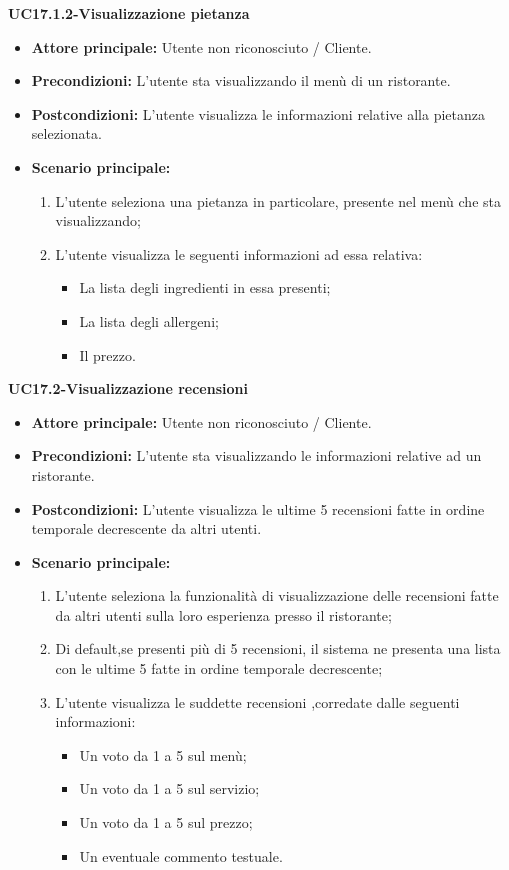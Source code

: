 \textbf{UC17.1.2-Visualizzazione pietanza}
\begin{itemize}
\item \textbf{Attore principale:} Utente non riconosciuto / Cliente.
\item \textbf{Precondizioni:} L'utente sta visualizzando il menù di un ristorante.
\item \textbf{Postcondizioni:} L'utente visualizza le informazioni relative alla pietanza selezionata.
\item \textbf{Scenario principale:}
\begin{enumerate}
    \item L'utente seleziona una pietanza in particolare, presente nel menù che sta visualizzando;
    \item L'utente visualizza le seguenti informazioni ad essa relativa:
    \begin{itemize}
        \item La lista degli ingredienti in essa presenti;
        \item La lista degli allergeni;
        \item Il prezzo.
    \end{itemize}
\end{enumerate}
\end{itemize}

\textbf{UC17.2-Visualizzazione recensioni}
\begin{itemize}
\item \textbf{Attore principale:} Utente non riconosciuto / Cliente.
\item \textbf{Precondizioni:} L'utente sta visualizzando le informazioni relative ad un ristorante.
\item \textbf{Postcondizioni:} L'utente visualizza le ultime 5 recensioni fatte in ordine temporale decrescente da altri utenti.
\item \textbf{Scenario principale:}
\begin{enumerate}
    \item L'utente seleziona la funzionalità di visualizzazione delle recensioni fatte da altri utenti
    sulla loro esperienza presso il ristorante;
    \item Di default,se presenti più di 5 recensioni, il sistema ne presenta una lista con le ultime 5 fatte in ordine temporale decrescente;
    \item L'utente visualizza le suddette recensioni ,corredate dalle seguenti informazioni:
    \begin{itemize}
        \item Un voto da 1 a 5 sul menù;
        \item Un voto da 1 a 5 sul servizio;
        \item Un voto da 1 a 5 sul prezzo;
        \item Un eventuale commento testuale.
    \end{itemize}
\end{enumerate}
\end{itemize}

